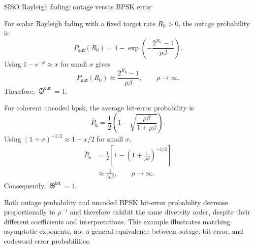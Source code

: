\begin{example}{SISO Rayleigh fading: outage versus BPSK error}
	
	For scalar Rayleigh fading with a fixed target rate $R_0>0$, the outage probability is
	\begin{equation*}
		P_{\mathsf{out}}(R_0)
		=1-\exp\left(
		-\frac{2^{R_0}-1}{\rho\beta}
		\right).
	\end{equation*}
	Using $1-e^{-x}\approx x$ for small $x$ gives
	\begin{equation*}
		P_{\mathsf{out}}(R_0)
		\approx\frac{2^{R_0}-1}{\rho\beta},
		\qquad \rho\to\infty.
	\end{equation*}
	Therefore, $\odiv^{\mathsf{out}}=1$.
	
	For coherent uncoded \ac{bpsk}, the average bit-error probability is
	\begin{equation*}
		\overline P_{\mathsf b}
		=\frac12\left(
		1-\sqrt{\frac{\rho\beta}{1+\rho\beta}}
		\right).
	\end{equation*}
	Using $(1+x)^{-1/2}\approx1-x/2$ for small $x$,
	\begin{align*}
		\overline P_{\mathsf b}
		&=\frac12\left[
		1-\left(1+\frac{1}{\rho\beta}\right)^{-1/2}
		\right]\\
		&\approx\frac{1}{4\rho\beta},
		\qquad \rho\to\infty.
	\end{align*}
	Consequently, $\odiv^{\mathsf{bit}}=1$.
	
	Both outage probability and uncoded BPSK bit-error probability decrease proportionally to $\rho^{-1}$ and therefore exhibit the same diversity order, despite their different coefficients and interpretations. This example illustrates matching asymptotic exponents, not a general equivalence between outage, bit-error, and codeword error probabilities.
\end{example}



